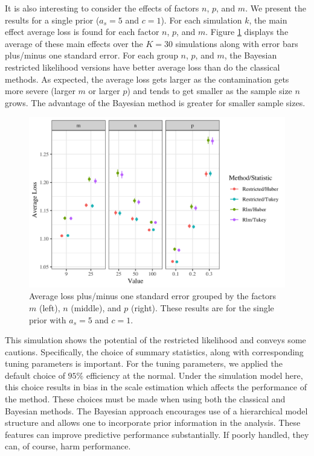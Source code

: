 \documentclass[ba]{imsart}
\begin{document}
It is also interesting to consider the effects of factors $n$, $p$, and $m$.  We present the results for a single prior ($a_s = 5$ and $c = 1$).  For each simulation $k$, the main effect average loss is found for each factor $n$, $p$, and $m$. Figure \ref{kl_mnp} displays the average of these main effects over the $K = 30$ simulations along  with error bars plus/minus one standard error. For each group $n$, $p$, and $m$, the Bayesian restricted likelihood versions have better average loss than do the classical methods. As expected, the average loss gets larger as the contamination gets more severe (larger $m$ or larger $p$) and tends to get smaller as the sample size $n$ grows.  The advantage of the Bayesian method is greater for smaller sample sizes.  

\begin{figure}[t]
\centering
\includegraphics[width = 5in]{MSE_sim2_mnp.png}
\caption{Average loss plus/minus one standard error grouped by the factors $m$ (left), $n$ (middle), and $p$ (right). These results are for the single prior with $a_s = 5$ and $c = 1$.}
\label{kl_mnp}
\end{figure}

This simulation shows the potential of the restricted likelihood and conveys some cautions.  Specifically, the choice of summary statistics, along with corresponding tuning parameters is important. For the tuning parameters, we applied the default choice of $95\%$ efficiency at the normal.  Under the simulation model here, this choice results in bias in the scale estimation which affects the performance of the method. These choices must be made when using both the classical and Bayesian methods. The Bayesian approach encourages use of a hierarchical model structure and allows one to incorporate prior information in the analysis.  These features can improve predictive performance substantially.  If poorly handled, they can, of course, harm performance.  
\end{document}
